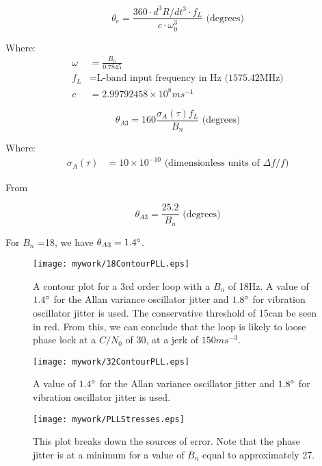 \begin{equation}
\theta_e = \frac{360 \cdot d^3R/dt^3  \cdot f_L}{c  \cdot \omega^3_0} \text{ (degrees)}
\end{equation}


Where:
\begin{align*}
\omega &= \frac{B_n}{0.7845} \\
f_L &= \text{L-band input frequency in Hz (1575.42MHz)}\\ 
c & = 2.99792458 \times 10^8 ms^{-1}
\end{align*}




\begin{equation}
\theta_{A3} = 160 \frac{\sigma_A(\tau)f_L}{B_n} \text{ (degrees)}
\end{equation}

Where:
\begin{align*}
\sigma_A(\tau) &= 10 \times 10^{-10} \text{ (dimensionless units of }\Delta f/f\text{)}
\end{align*}

From \cite{VT803Datasheet}


\begin{equation}
\theta_{A3} =\frac{25.2}{B_n} \text{ (degrees)}
\end{equation}

For $B_n$ =18, we have $\theta_{A3}=1.4\degree$.


\begin{figure}[!htb] 
    \centering
    \texttt{[image: mywork/18ContourPLL.eps]} 
    \caption{A contour plot for a 3rd order loop with a $B_n$ of 18Hz. A value of $1.4\degree$ for the Allan variance oscillator jitter and $1.8\degree$ for vibration oscillator jitter is used. The conservative threshold of 15\degree can be seen in red. From this, we can conclude that the loop is likely to loose phase lock at a $C/N_0$ of 30,  at a jerk of $150ms^{-3}$.}
\end{figure}

\begin{figure}[!htb] 
    \centering
    \texttt{[image: mywork/32ContourPLL.eps]} 
    \caption{A value of $1.4\degree$ for the Allan variance oscillator jitter and $1.8\degree$ for vibration oscillator jitter is used.}
\end{figure}


\begin{figure}[!htb] 
    \centering
    \texttt{[image: mywork/PLLStresses.eps]} 
    \caption{This plot breaks down the sources of error. Note that the phase jitter is at a minimum for a value of $B_n$ equal to approximately 27.}
\end{figure}





